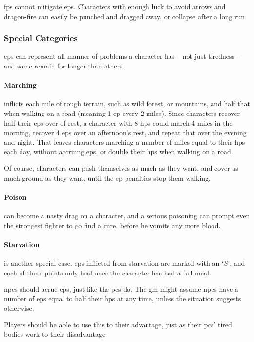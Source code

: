 \begin{multicols}{2}
\Glspl{fp} cannot mitigate \glspl{ep}.
Characters with enough luck to avoid arrows and dragon-fire can easily be punched and dragged away, or collapse after a long run.

\subsubsection{Special Categories}

\Glspl{ep} can represent all manner of problems a character has -- not just tiredness -- and some remain for longer than others.

\paragraph{Marching} inflicts  each mile of rough terrain, such as wild forest, or mountains, and half that when walking on a road (meaning 1 \gls{ep} every 2 miles).
Since characters recover half their \glspl{ep} over  of rest, a character with 8 \glspl{hp} could march 4 miles in the morning, recover 4 \glspl{ep} over an afternoon's rest, and repeat that over the evening and night.
That leaves characters marching a number of miles equal to their \glspl{hp} each day, without accruing \glspl{ep}, or double their \glspl{hp} when walking on a road.

Of course, characters can push themselves as much as they want, and cover as much ground as they want, until the \gls{ep} penalties stop them walking.

\paragraph{Poison} can become a nasty drag on a character, and a serious poisoning can prompt even the strongest fighter to go find a cure, before he vomits any more blood.

\paragraph{Starvation} is another special case.
\glspl{ep} inflicted from starvation are marked with an `$S$', and each of these points only heal once the character has had a full meal.


\Glspl{npc} should acrue \glspl{ep}, just like the \glspl{pc} do.
The \gls{gm} might assume \glspl{npc} have a number of \glspl{ep} equal to half their \glspl{hp} at any time, unless the situation suggests otherwise.

Players should be able to use this to their advantage, just as their \glspl{pc}' tired bodies work to their disadvantage.

\end{multicols}

